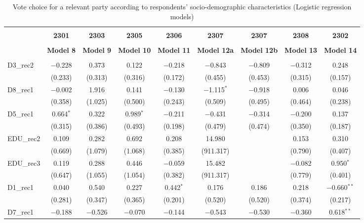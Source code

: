 \documentclass[
]{article}
\begin{document}
\begin{table}[!htbp] \centering 
  \caption{Vote choice for a relevant party according to respondents' 
                       socio-demographic characteristics (Logistic regression models)} 
  \label{table:full_logit_ro} 
\small 
\begin{tabular}{@{\extracolsep{0.5pt}}lcccccccc} 
\\[-1.8ex]\hline \\[-1.8ex] 
 & \textbf{2301} & \textbf{2303} & \textbf{2305} & \textbf{2306} & \textbf{2307} & \textbf{2307} & \textbf{2308} & \textbf{2302} \\ 
\\[-1.8ex] & \textbf{Model 8} & \textbf{Model 9} & \textbf{Model 10} & \textbf{Model 11} & \textbf{Model 12a} & \textbf{Model 12b} & \textbf{Model 13} & \textbf{Model 14}\\ 
\hline \\[-1.8ex] 
 D3\_rec2 & $-$0.228 & 0.373 & 0.122 & $-$0.218 & $-$0.843 & $-$0.809 & $-$0.312 & 0.248 \\ 
  & (0.233) & (0.313) & (0.316) & (0.172) & (0.455) & (0.453) & (0.315) & (0.157) \\ 
  D8\_rec1 & $-$0.002 & 1.916 & 0.141 & $-$0.130 & $-$1.115$^{*}$ & $-$0.918 & 0.006 & 0.046 \\ 
  & (0.358) & (1.025) & (0.500) & (0.243) & (0.509) & (0.495) & (0.464) & (0.238) \\ 
  D5\_rec1 & 0.664$^{*}$ & 0.322 & 0.989$^{*}$ & $-$0.211 & $-$0.431 & $-$0.314 & $-$0.200 & 0.137 \\ 
  & (0.315) & (0.386) & (0.493) & (0.198) & (0.479) & (0.474) & (0.350) & (0.187) \\ 
  EDU\_rec2 & 0.109 & 0.282 & 0.692 & 0.208 & 14.980 &  & 0.153 & 0.310 \\ 
  & (0.669) & (1.079) & (1.068) & (0.385) & (911.317) &  & (0.790) & (0.407) \\ 
  EDU\_rec3 & 0.119 & 0.288 & 0.446 & $-$0.059 & 15.482 &  & $-$0.082 & 0.950$^{*}$ \\ 
  & (0.647) & (1.055) & (1.054) & (0.382) & (911.317) &  & (0.779) & (0.401) \\ 
  D1\_rec1 & 0.040 & 0.540 & 0.227 & 0.442$^{*}$ & 0.176 & 0.186 & 0.218 & $-$0.660$^{**}$ \\ 
  & (0.281) & (0.347) & (0.365) & (0.201) & (0.520) & (0.520) & (0.374) & (0.217) \\ 
  D7\_rec1 & $-$0.188 & $-$0.526 & $-$0.070 & $-$0.144 & $-$0.543 & $-$0.530 & $-$0.360 & 0.618$^{**}$ \\ 

\end{tabular}
\end{table}
\end{document}
